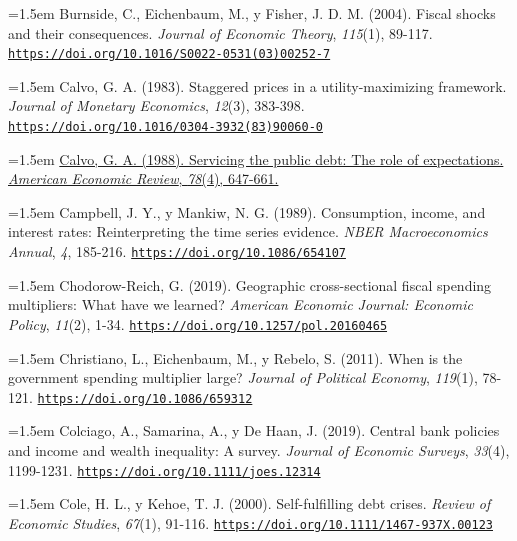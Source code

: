 \documentclass[10pt,a4paper]{article}
\begin{document}
\noindent\hangindent=1.5em Burnside, C., Eichenbaum, M., y Fisher, J. D. M. (2004). Fiscal shocks and their consequences. \textit{Journal of Economic Theory}, \textit{115}(1), 89-117. \href{https://doi.org/10.1016/S0022-0531(03)00252-7}{\nolinkurl{https://doi.org/10.1016/S0022-0531(03)00252-7}}

\noindent\hangindent=1.5em Calvo, G. A. (1983). Staggered prices in a utility-maximizing framework. \textit{Journal of Monetary Economics}, \textit{12}(3), 383-398. \href{https://doi.org/10.1016/0304-3932(83)90060-0}{\nolinkurl{https://doi.org/10.1016/0304-3932(83)90060-0}}

\noindent\hangindent=1.5em \href{https://www.jstor.org/stable/1811165}{Calvo, G. A. (1988). Servicing the public debt: The role of expectations. \textit{American Economic Review}, \textit{78}(4), 647-661.}

\noindent\hangindent=1.5em Campbell, J. Y., y Mankiw, N. G. (1989). Consumption, income, and interest rates: Reinterpreting the time series evidence. \textit{NBER Macroeconomics Annual}, \textit{4}, 185-216. \href{https://doi.org/10.1086/654107}{\nolinkurl{https://doi.org/10.1086/654107}}

\noindent\hangindent=1.5em Chodorow-Reich, G. (2019). Geographic cross-sectional fiscal spending multipliers: What have we learned? \textit{American Economic Journal: Economic Policy}, \textit{11}(2), 1-34. \href{https://doi.org/10.1257/pol.20160465}{\nolinkurl{https://doi.org/10.1257/pol.20160465}}

\noindent\hangindent=1.5em Christiano, L., Eichenbaum, M., y Rebelo, S. (2011). When is the government spending multiplier large? \textit{Journal of Political Economy}, \textit{119}(1), 78-121. \href{https://doi.org/10.1086/659312}{\nolinkurl{https://doi.org/10.1086/659312}}

\noindent\hangindent=1.5em Colciago, A., Samarina, A., y De Haan, J. (2019). Central bank policies and income and wealth inequality: A survey. \textit{Journal of Economic Surveys}, \textit{33}(4), 1199-1231. \href{https://doi.org/10.1111/joes.12314}{\nolinkurl{https://doi.org/10.1111/joes.12314}}

\noindent\hangindent=1.5em Cole, H. L., y Kehoe, T. J. (2000). Self-fulfilling debt crises. \textit{Review of Economic Studies}, \textit{67}(1), 91-116. \href{https://doi.org/10.1111/1467-937X.00123}{\nolinkurl{https://doi.org/10.1111/1467-937X.00123}}
\end{document}
